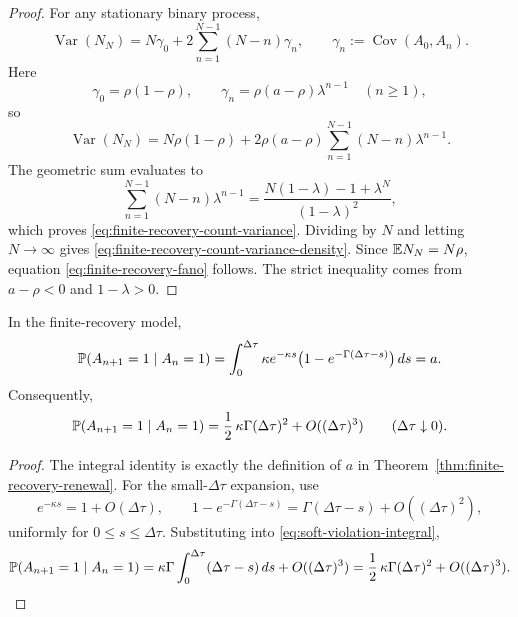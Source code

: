\begin{proof}
For any stationary binary process,
\[
\operatorname{Var}(N_N)
=
N\gamma_0+2\sum_{n=1}^{N-1}(N-n)\gamma_n,
\qquad
\gamma_n:=\operatorname{Cov}(A_0,A_n).
\]
Here
\[
\gamma_0=\rho(1-\rho),
\qquad
\gamma_n=\rho(a-\rho)\lambda^{n-1}\quad (n\ge 1),
\]
so
\[
\operatorname{Var}(N_N)
=
N\rho(1-\rho)
+
2\rho(a-\rho)\sum_{n=1}^{N-1}(N-n)\lambda^{n-1}.
\]
The geometric sum evaluates to
\[
\sum_{n=1}^{N-1}(N-n)\lambda^{n-1}
=
\frac{N(1-\lambda)-1+\lambda^N}{(1-\lambda)^2},
\]
which proves \eqref{eq:finite-recovery-count-variance}. Dividing by $N$ and letting $N\to\infty$ gives \eqref{eq:finite-recovery-count-variance-density}. Since $\mathbb{E} N_N=N\rho$, equation \eqref{eq:finite-recovery-fano} follows. The strict inequality comes from $a-\rho<0$ and $1-\lambda>0$.
\end{proof}

\begin{proposition}\label{prop:soft-dead-time}
In the finite-recovery model,
\begin{equation}\label{eq:soft-violation-integral}
\mathbb{P}(A_{n+1}=1\mid A_n=1)
=
\int_0^{\Delta\tau}
\kappa e^{-\kappa s}
\bigl(1-e^{-\Gamma(\Delta\tau-s)}\bigr)\,ds
=
a.
\end{equation}
Consequently,
\begin{equation}\label{eq:soft-violation-asymptotic}
\mathbb{P}(A_{n+1}=1\mid A_n=1)
=
\frac12\,\kappa\Gamma(\Delta\tau)^2
+
O((\Delta\tau)^3)
\qquad
(\Delta\tau\downarrow 0).
\end{equation}
\end{proposition}

\begin{proof}
The integral identity is exactly the definition of $a$ in Theorem~\ref{thm:finite-recovery-renewal}. For the small-$\Delta\tau$ expansion, use
\[
e^{-\kappa s}=1+O(\Delta\tau),
\qquad
1-e^{-\Gamma(\Delta\tau-s)}=\Gamma(\Delta\tau-s)+O((\Delta\tau)^2),
\]
uniformly for $0\le s\le \Delta\tau$. Substituting into \eqref{eq:soft-violation-integral},
\[
\mathbb{P}(A_{n+1}=1\mid A_n=1)
=
\kappa\Gamma
\int_0^{\Delta\tau}(\Delta\tau-s)\,ds
+
O((\Delta\tau)^3)
=
\frac12\,\kappa\Gamma(\Delta\tau)^2+O((\Delta\tau)^3).
\]
\end{proof}

